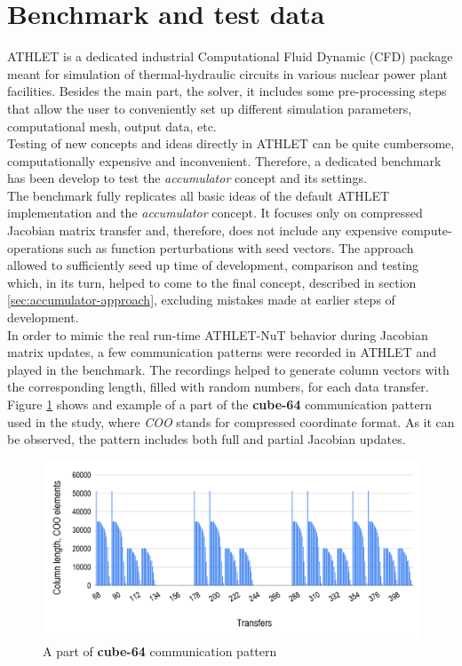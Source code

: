 \section{Benchmark and test data}
\label{sec:benchmark-and-test-data}


ATHLET is a dedicated industrial Computational Fluid Dynamic (CFD) package meant for simulation of thermal-hydraulic circuits in various nuclear power plant facilities. Besides the main part, the solver, it includes some pre-processing steps that allow the user to conveniently set up different simulation parameters, computational mesh, output data, etc.\\


Testing of new concepts and ideas directly in ATHLET can be quite cumbersome, computationally expensive and inconvenient. Therefore, a dedicated benchmark has been develop to test the \textit{accumulator} concept and its settings.\\


The benchmark fully replicates all basic ideas of the default ATHLET implementation and the \textit{accumulator} concept. It  focuses only on compressed Jacobian matrix transfer and, therefore, does not include any expensive compute-operations such as function perturbations with seed vectors. The approach allowed to sufficiently seed up time of development, comparison and testing which, in its turn, helped to come to the final concept, described in section \ref{sec:accumulator-approach}, excluding mistakes made at earlier steps of development.\\


In order to mimic the real run-time ATHLET-NuT behavior during Jacobian matrix updates, a few communication patterns were recorded in ATHLET and played in the benchmark. The recordings helped to generate column vectors with the corresponding length, filled with random numbers, for each data transfer. Figure \ref{fig:communication-pattern} shows and example of a part of the \textbf{cube-64} communication pattern used in the study, where \textit{COO} stands for compressed coordinate format. As it can be observed, the pattern includes both full and partial Jacobian updates.\\


\begin{figure}[htpb]
  \centering
  \includegraphics[width=1.0\textwidth]{figures/chapter-3/communication-pattern.png}
  \caption{A part of \textbf{cube-64} communication pattern} \label{fig:communication-pattern}
\end{figure}


